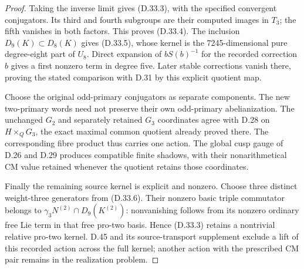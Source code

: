 \begin{proof}
Taking the inverse limit gives (D.33.3), with the specified convergent
conjugators. Its third and fourth subgroups are their computed images
in $T_3$; the fifth vanishes in both factors. This proves (D.33.4).
The inclusion $D_9(K)\subset D_8(K)$ gives (D.33.5), whose kernel is
the 7245-dimensional pure degree-eight part of $U_8$. Direct expansion
of $bS(b)^{-1}$ for the recorded correction $b$ gives a first nonzero
term in degree five. Later stable corrections vanish there, proving
the stated comparison with D.31 by this explicit quotient map.

Choose the original odd-primary conjugators as separate components.
The new two-primary words need not preserve their own odd-primary
abelianization. The unchanged $G_2$ and separately retained $G_3$
coordinates agree with D.28 on $H\times_QG_3$, the exact maximal
common quotient already proved there. The corresponding fibre product
thus carries one action. The global cusp gauge of D.26 and D.29
produces compatible finite shadows, with their nonarithmetical CM
value retained whenever the quotient retains those coordinates.

Finally the remaining source kernel is explicit and nonzero. Choose
three distinct weight-three generators from (D.33.6). Their nonzero
basic triple commutator belongs to
$\gamma_3N^{(2)}\cap D_9(K^{(2)})$: nonvanishing follows from its
nonzero ordinary free Lie term in that free pro-two basis. Hence
(D.33.3) retains a nontrivial relative pro-two kernel. D.45 and
its source-transport supplement exclude a lift of this recorded
action across the full kernel; another action with the prescribed
CM pair remains in the realization problem.
\end{proof}
